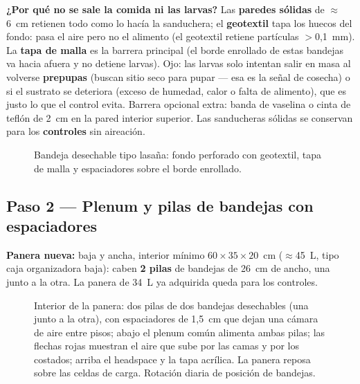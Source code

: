\documentclass[11pt,a4paper]{article}
\newcommand{\paso}[1]{\subsection*{\large Paso #1}}
\begin{document}
\noindent\textbf{¿Por qué no se sale la comida ni las larvas?} Las
\textbf{paredes sólidas} de ${\approx}$6~cm retienen todo como lo hacía la
sanduchera; el \textbf{geotextil} tapa los huecos del fondo: pasa el aire
pero no el alimento (el geotextil retiene partículas $>$0,1~mm). La
\textbf{tapa de malla} es la barrera principal (el borde enrollado de estas
bandejas va hacia afuera y no detiene larvas). Ojo: las larvas solo intentan
salir en masa al volverse \textbf{prepupas} (buscan sitio seco para pupar
--- esa es la señal de cosecha) o si el sustrato se deteriora (exceso de
humedad, calor o falta de alimento), que es justo lo que el control evita.
Barrera opcional extra: banda de vaselina o cinta de teflón de 2~cm en la
pared interior superior. Las sanducheras sólidas se conservan para los
\textbf{controles} sin aireación.

\begin{figure}[h!]
\centering
\resizebox{0.95\textwidth}{!}{}
\caption{Bandeja desechable tipo lasaña: fondo perforado con geotextil,
tapa de malla y espaciadores sobre el borde enrollado.}
\label{fig:bandeja}
\end{figure}

\paso{2 --- Plenum y pilas de bandejas con espaciadores}
\textbf{Panera nueva:} baja y ancha, interior mínimo
$60\times35\times20$~cm (${\approx}$45~L, tipo caja organizadora baja):
caben \textbf{2 pilas} de bandejas de 26~cm de ancho, una junto a la otra.
La panera de 34~L ya adquirida queda para los controles.

\begin{figure}[h!]
\centering
\resizebox{0.95\textwidth}{!}{}
\caption{Interior de la panera: dos pilas de dos bandejas desechables (una
junto a la otra), con espaciadores de 1,5~cm que dejan una cámara de aire
entre pisos; abajo el plenum común alimenta ambas pilas; las flechas rojas
muestran el aire que sube por las camas y por los costados; arriba el
headspace y la tapa acrílica. La panera reposa sobre las celdas de carga.
Rotación diaria de posición de bandejas.}
\label{fig:apilado}
\end{figure}
\end{document}
